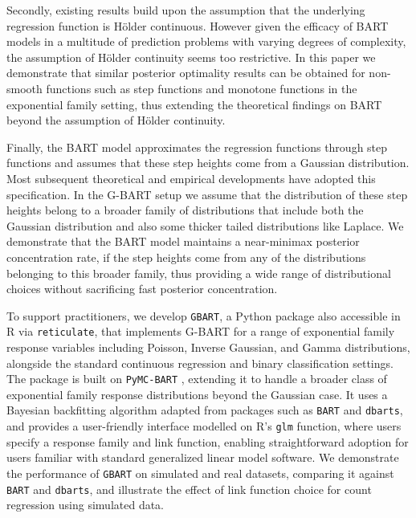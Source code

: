 \documentclass[12pt]{article}
\newcommand{\1}{\mathbb{I}}
\theoremstyle{plain}
\theoremstyle{definition}
\theoremstyle{remark}
\begin{document}
Secondly, existing results \citep{rockova2020posterior, rockova2019theory, linero2017bayesian} build upon the assumption that the underlying regression function is H\"{o}lder continuous. However given the efficacy of BART models in a multitude of prediction problems with varying degrees of complexity, the assumption of H\"{o}lder continuity seems too restrictive. In this paper we demonstrate that similar posterior optimality results can be obtained for non-smooth functions such as step functions and monotone functions in the exponential family setting, thus extending the theoretical findings on BART beyond the assumption of H\"older continuity. 

Finally, the BART model \cite{chipman2010bart} approximates the regression functions through step functions and assumes that these step heights come from a Gaussian distribution. Most subsequent theoretical and empirical developments have adopted this specification. In the G-BART setup we assume that the distribution of these step heights belong to a broader family of distributions that include both the Gaussian distribution and also some thicker tailed distributions like Laplace. We demonstrate that the BART model maintains a near-minimax posterior concentration rate, if the step heights come from any of the distributions belonging to this broader family, thus providing a wide range of distributional choices without sacrificing fast posterior concentration.

To support practitioners, we develop \texttt{GBART}, a Python package also accessible in R via \texttt{reticulate}, that implements G-BART for a range of exponential family response variables including Poisson, Inverse Gaussian, and Gamma distributions, alongside the standard continuous regression and binary classification settings. The package is built on \texttt{PyMC-BART} \citep{quiroga2022bayesian}, extending it to handle a broader class of exponential family response distributions beyond the Gaussian case. It uses a Bayesian backfitting algorithm adapted from packages such as \texttt{BART} and \texttt{dbarts}, and provides a user-friendly interface modelled on R's \texttt{glm} function, where users specify a response family and link function, enabling straightforward adoption for users familiar with standard generalized linear model software. We demonstrate the performance of \texttt{GBART} on simulated and real datasets, comparing it against \texttt{BART} and \texttt{dbarts}, and illustrate the effect of link function choice for count regression using simulated data.
\end{document}
